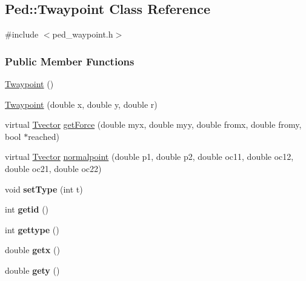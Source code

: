 \hypertarget{classPed_1_1Twaypoint}{
\subsection{Ped::Twaypoint Class Reference}
\label{classPed_1_1Twaypoint}
}


{\ttfamily \#include $<$ped\_\-waypoint.h$>$}

\subsubsection*{Public Member Functions}
\begin{DoxyCompactItemize}
\item 
\hyperlink{classPed_1_1Twaypoint_a063b41ed3b634f630a9627e6c7897da5}{Twaypoint} ()
\item 
\hyperlink{classPed_1_1Twaypoint_a60f5e82b79ab64d9c75fa4044562509f}{Twaypoint} (double x, double y, double r)
\item 
virtual \hyperlink{classPed_1_1Tvector}{Tvector} \hyperlink{classPed_1_1Twaypoint_ab0f06a6a6d4aee8084d05f62c3057598}{getForce} (double myx, double myy, double fromx, double fromy, bool $\ast$reached)
\item 
virtual \hyperlink{classPed_1_1Tvector}{Tvector} \hyperlink{classPed_1_1Twaypoint_a584090bff0d7c15162455032aeeef308}{normalpoint} (double p1, double p2, double oc11, double oc12, double oc21, double oc22)
\item 
\hypertarget{classPed_1_1Twaypoint_a7be71e236ea4606dfef062bbae934282}{
void {\bfseries setType} (int t)}
\label{classPed_1_1Twaypoint_a7be71e236ea4606dfef062bbae934282}

\item 
\hypertarget{classPed_1_1Twaypoint_a9263a206dedff6a6ff2f4ea621cf9b1c}{
int {\bfseries getid} ()}
\label{classPed_1_1Twaypoint_a9263a206dedff6a6ff2f4ea621cf9b1c}

\item 
\hypertarget{classPed_1_1Twaypoint_ae2e5a1946e38381908c8abade7a4e6b1}{
int {\bfseries gettype} ()}
\label{classPed_1_1Twaypoint_ae2e5a1946e38381908c8abade7a4e6b1}

\item 
\hypertarget{classPed_1_1Twaypoint_a9a58db618c5d9b0f21d05ef9c97e4a1c}{
double {\bfseries getx} ()}
\label{classPed_1_1Twaypoint_a9a58db618c5d9b0f21d05ef9c97e4a1c}

\item 
\hypertarget{classPed_1_1Twaypoint_a2318a99ab5cfb3b2a30413b7173b4e1e}{
double {\bfseries gety} ()}
\label{classPed_1_1Twaypoint_a2318a99ab5cfb3b2a30413b7173b4e1e}


\end{DoxyCompactItemize}

